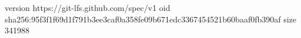 version https://git-lfs.github.com/spec/v1
oid sha256:95f3f1f69d1f791b3ee3caf0a358fe09b671edc3367454521b60baaf0fb390af
size 341988
